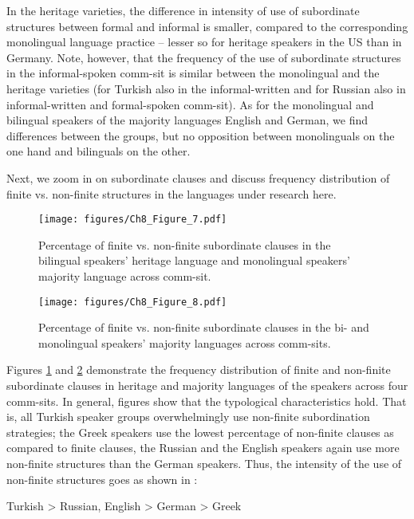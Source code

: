 \documentclass[output=paper,colorlinks,citecolor=brown]{langscibook}
\begin{document}
In the heritage varieties, the difference in intensity of use of subordinate structures between formal and informal is smaller, compared to the corresponding monolingual language practice – lesser so for heritage speakers in the US than in Germany. Note, however, that the frequency of the use of subordinate structures in the informal-spoken comm-sit is similar between the monolingual and the heritage varieties (for Turkish also in the informal-written and for Russian also in informal-written and formal-spoken comm-sit). As for the monolingual and bilingual speakers of the majority languages English and German, we find differences between the groups, but no opposition between monolinguals on the one hand and bilinguals on the other.

Next, we zoom in on subordinate clauses and discuss frequency distribution of finite vs. non-finite structures in the languages under research here.

\begin{figure}
    \centering
    \texttt{[image: figures/Ch8\_Figure\_7.pdf]}
    \caption{Percentage of finite vs. non-finite subordinate clauses in the bilingual speakers’ heritage language and monolingual speakers’ majority language across comm-sit.}
    \label{fig:schroederetal:7}
\end{figure}

\begin{figure}
    \centering
    \texttt{[image: figures/Ch8\_Figure\_8.pdf]}
    \caption{Percentage of finite vs. non-finite subordinate clauses in the bi- and monolingual speakers’ majority languages across comm-sits.}
    \label{fig:schroederetal:8}
\end{figure}

Figures \ref{fig:schroederetal:7} and \ref{fig:schroederetal:8} demonstrate the frequency distribution of finite and non-finite subordinate clauses in heritage and majority languages of the speakers across four comm-sits. In general, figures show that the typological characteristics hold. That is, all Turkish speaker groups overwhelmingly use non-finite subordination strategies; the Greek speakers use the lowest percentage of non-finite clauses as compared to finite clauses, the Russian and the English speakers again use more non-finite structures than the German speakers. Thus, the intensity of the use of non-finite structures goes as shown in :

\begin{center}
  Turkish > Russian, English > German > Greek
\end{center}
\end{document}
